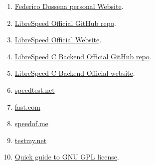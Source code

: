 \documentclass{article}
\begin{document}
\begin{enumerate}
\item \href{https://www.fdossena.com}{Federico Dossena personal Website}.
\item \href{https://github.com/librespeed}{LibreSpeed Official GitHub repo}.
\item \href{https://www.librespeed.org/}{LibreSpeed Official Website}.
\item \href{https://github.com/sergiusxp/LibreSpeedCBackend}{LibreSpeed C Backend Official GitHub repo}.
\item \href{https://speedtest.sergiomeloni.com}{LibreSpeed C Backend Official website}.
\item \href{https://speedtest.net}{speedtest.net}
\item \href{https://fast.com}{fast.com}
\item \href{https://speedof.me}{speedof.me}
\item \href{https://testmy.net}{testmy.net}
\item \href{https://www.gnu.org/licenses/quick-guide-gplv3.en.html}{Quick guide to GNU GPL license}.
\end{enumerate}
\end{document}

